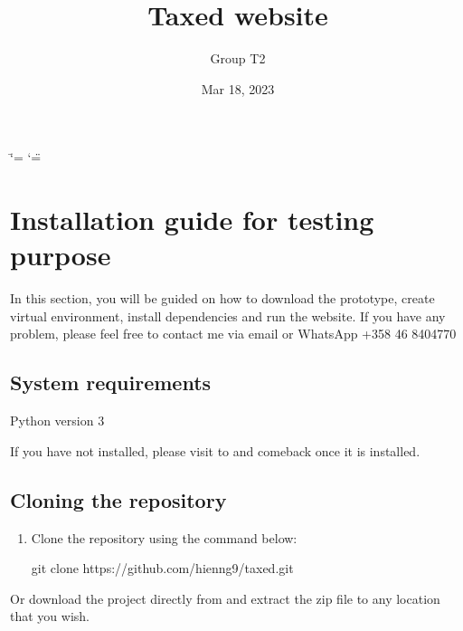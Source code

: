 \documentclass[letterpaper,10pt,english]{sphinxmanual}
\title{Taxed website}
\date{Mar 18, 2023}
\author{Group T2}
\begin{document}
\ifdefined\shorthandoff
  \ifnum\catcode`\=\string=\active\shorthandoff{=}\fi
  \ifnum\catcode`\"=\active{}\fi
\fi

\pagestyle{empty}
\sphinxmaketitle
\pagestyle{plain}
\sphinxtableofcontents
\pagestyle{normal}
\label{\detokenize{index::doc}}


\sphinxstepscope


\chapter{Installation guide for testing purpose}
\label{\detokenize{pages/installation-testing:installation-guide-for-testing-purpose}}\label{\detokenize{pages/installation-testing::doc}}
\sphinxAtStartPar
In this section, you will be guided on how to download the prototype, create virtual environment, install dependencies and run the website.
If you have any problem, please feel free to contact me via email  or WhatsApp +358 46 8404770


\section{System requirements}
\label{\detokenize{pages/installation-testing:system-requirements}}
\sphinxAtStartPar
Python version 3

\sphinxAtStartPar
If you have not installed, please visit to  and comeback once it is installed.


\section{Cloning the repository}
\label{\detokenize{pages/installation-testing:cloning-the-repository}}\begin{enumerate}
%
\item {} 
\sphinxAtStartPar
Clone the repository using the command below:

\begin{sphinxVerbatim}[commandchars=\\\{\}]
\PYGZdl{} git clone https://github.com/hienng9/taxed.git
\end{sphinxVerbatim}

\end{enumerate}

\sphinxAtStartPar
Or download the project directly from  and extract the zip file to any location that you wish.
\end{document}
